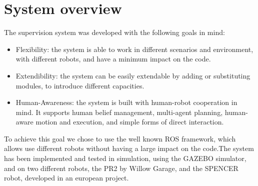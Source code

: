 \section{System overview}
\label{intro-system_overview}
The supervision system was developed with the following goals in mind:
\begin{itemize}
\item Flexibility: the system is able to work in different scenarios and environment, with different robots, and have a minimum impact on the code.  
\item Extendibility: the system can be easily extendable by adding or substituting modules, to introduce different capacities.
\item Human-Awareness: the system is built with human-robot cooperation in mind. It supports human belief management, multi-agent planning, human-aware motion and execution, and simple forms of direct interaction.
\end{itemize}

To achieve this goal we chose to use the well known ROS framework, which allows use different robots without having a large impact on the code.The system has been implemented and tested in simulation, using the GAZEBO simulator, and on two different robots, the PR2 by Willow Garage, and the SPENCER robot, developed in an european project. 

